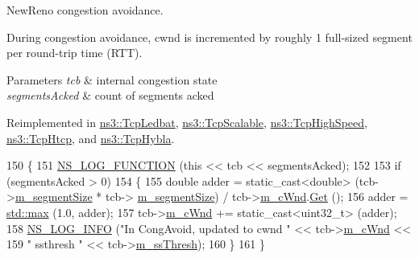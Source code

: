 New\+Reno congestion avoidance. 

During congestion avoidance, cwnd is incremented by roughly 1 full-\/sized segment per round-\/trip time (R\+TT).


\begin{DoxyParams}{Parameters}
{\em tcb} & internal congestion state \\
\hline
{\em segments\+Acked} & count of segments acked \\
\hline
\end{DoxyParams}


Reimplemented in \hyperlink{classns3_1_1TcpLedbat_a592b6df30581c978ddabf095eb0300c6}{ns3\+::\+Tcp\+Ledbat}, \hyperlink{classns3_1_1TcpScalable_aa0c22097e0628f16f321d79addc58976}{ns3\+::\+Tcp\+Scalable}, \hyperlink{classns3_1_1TcpHighSpeed_ab241f8400ad52cff3e2f04ed8d00983c}{ns3\+::\+Tcp\+High\+Speed}, \hyperlink{classns3_1_1TcpHtcp_a5eb471eacd7966cf548024c3870cc3bf}{ns3\+::\+Tcp\+Htcp}, and \hyperlink{classns3_1_1TcpHybla_a10463113be84c3506fe85b5abfe8b186}{ns3\+::\+Tcp\+Hybla}.


\begin{DoxyCode}
150 \{
151   \hyperlink{log-macros-disabled_8h_a90b90d5bad1f39cb1b64923ea94c0761}{NS\_LOG\_FUNCTION} (\textcolor{keyword}{this} << tcb << segmentsAcked);
152 
153   \textcolor{keywordflow}{if} (segmentsAcked > 0)
154     \{
155       \textcolor{keywordtype}{double} adder = \textcolor{keyword}{static\_cast<}\textcolor{keywordtype}{double}\textcolor{keyword}{>} (tcb->\hyperlink{classns3_1_1TcpSocketState_a079872f7b0099ef5f3cab4ff47bd2edd}{m\_segmentSize} * tcb->
      \hyperlink{classns3_1_1TcpSocketState_a079872f7b0099ef5f3cab4ff47bd2edd}{m\_segmentSize}) / tcb->\hyperlink{classns3_1_1TcpSocketState_a7cd3d2156a483c1db436097477a0fd7f}{m\_cWnd}.\hyperlink{classns3_1_1TracedValue_a10fddd1de961ac65acfbeb440a1e8551}{Get} ();
156       adder = \hyperlink{80211b_8c_affe776513b24d84b39af8ab0930fef7f}{std::max} (1.0, adder);
157       tcb->\hyperlink{classns3_1_1TcpSocketState_a7cd3d2156a483c1db436097477a0fd7f}{m\_cWnd} += \textcolor{keyword}{static\_cast<}uint32\_t\textcolor{keyword}{>} (adder);
158       \hyperlink{group__logging_gafbd73ee2cf9f26b319f49086d8e860fb}{NS\_LOG\_INFO} (\textcolor{stringliteral}{"In CongAvoid, updated to cwnd "} << tcb->\hyperlink{classns3_1_1TcpSocketState_a7cd3d2156a483c1db436097477a0fd7f}{m\_cWnd} <<
159                    \textcolor{stringliteral}{" ssthresh "} << tcb->\hyperlink{classns3_1_1TcpSocketState_aec003b6dba9d269bfb1036c7652ffbd6}{m\_ssThresh});
160     \}
161 \}
\end{DoxyCode}


